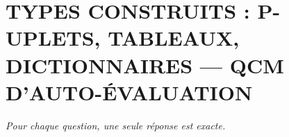 
\section*{\textcolor{chapcolor}{\MakeUppercase{Types construits : p-uplets, tableaux, dictionnaires — QCM d'auto-évaluation}}}

\begin{center}
\textit{Pour chaque question, une seule réponse est exacte.}
\end{center}


